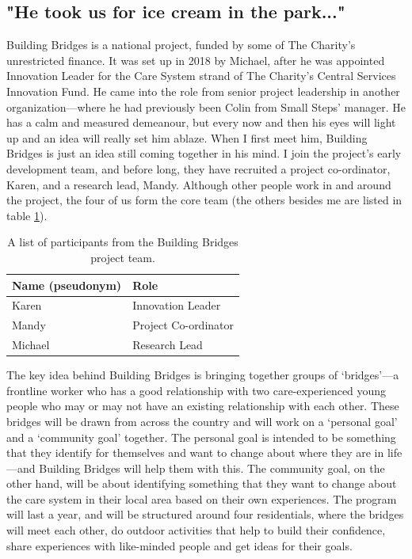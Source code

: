\subsection{"He took us for ice cream in the park..."}
\label{sec:4-building}
Building Bridges is a national project, funded by some of The Charity's unrestricted finance. It was set up in 2018 by Michael, after he was appointed Innovation Leader for the Care System strand of The Charity's Central Services Innovation Fund. He came into the role from senior project leadership in another organization—where he had previously been Colin from Small Steps' manager. He has a calm and measured demeanour, but every now and then his eyes will light up and an idea will really set him ablaze. When I first meet him, Building Bridges is just an idea still coming together in his mind. I join the project's early development team, and before long, they have recruited a project co-ordinator, Karen, and a research lead, Mandy. Although other people work in and around the project, the four of us form the core team (the others besides me are listed in table \ref{tab:building-bridges-participants}). 

\begin{table}[hbt!]
\centering
\begin{tabular}{|l|l|} \hline 
\textbf{Name (pseudonym)} & \textbf{Role}                    \\ \hline 
Karen& Innovation Leader\\ \hline 
Mandy& Project Co-ordinator\\ \hline 
Michael& Research Lead\\\hline\end{tabular}

\caption{A list of participants from the Building Bridges project team.}
\label{tab:building-bridges-participants}
\end{table}

The key idea behind Building Bridges is bringing together groups of `bridges'—a frontline worker who has a good relationship with two care-experienced young people who may or may not have an existing relationship with each other. These bridges will be drawn from across the country and will work on a `personal goal' and  a `community goal' together. The personal goal is intended to be something that they identify for themselves and want to change about where they are in life—and Building Bridges will help them with this. The community goal, on the other hand, will be about identifying something that they want to change about the care system in their local area based on their own experiences. The program will last a year, and will be structured around four residentials, where the bridges will meet each other, do outdoor activities that help to build their confidence, share experiences with like-minded people and get ideas for their goals. 

